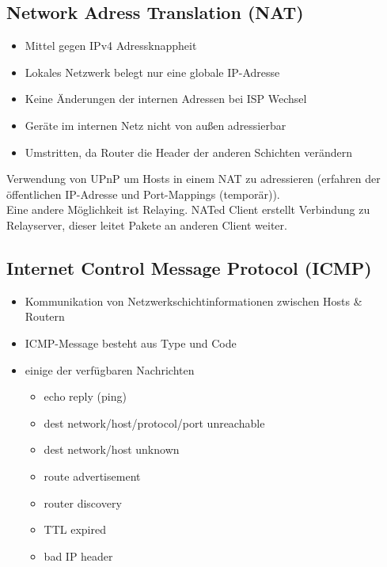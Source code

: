 \subsection{Network Adress Translation (NAT)}
\begin{itemize}
    \item Mittel gegen IPv4 Adressknappheit
    \item Lokales Netzwerk belegt nur eine globale IP-Adresse
    \item Keine Änderungen der internen Adressen bei ISP Wechsel
    \item Geräte im internen Netz nicht von außen adressierbar
    \item Umstritten, da Router die Header der anderen Schichten verändern
\end{itemize}
Verwendung von UPnP um Hosts in einem NAT zu adressieren (erfahren der öffentlichen IP-Adresse und Port-Mappings (temporär)).\\
Eine andere Möglichkeit ist Relaying. NATed Client erstellt Verbindung zu Relayserver, dieser leitet Pakete an anderen Client weiter.

\subsection{Internet Control Message Protocol (ICMP)}
\begin{itemize}
    \item Kommunikation von Netzwerkschichtinformationen zwischen Hosts \& Routern
    \item ICMP-Message besteht aus Type und Code
    \item einige der verfügbaren Nachrichten
            \begin{itemize}
                \item echo reply (ping)
                \item dest network/host/protocol/port unreachable
                \item dest network/host unknown
                \item route advertisement
                \item router discovery
                \item TTL expired
                \item bad IP header
            \end{itemize}
\end{itemize}

